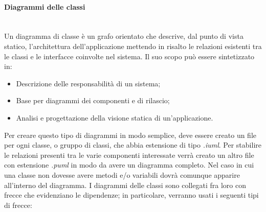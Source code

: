 \paragraph{Diagrammi delle classi}\mbox{}\\[0.4cm]
Un diagramma di classe è un grafo orientato che descrive, dal punto di vista statico, l'architettura dell'applicazione mettendo in risalto le relazioni esistenti tra le classi e le interfacce coinvolte nel sistema. Il suo scopo può essere sintetizzato in:
\begin{itemize}
    \item Descrizione delle responsabilità di un sistema;
    \item Base per diagrammi dei componenti e di rilascio;
    \item Analisi e progettazione della visione statica di un'applicazione.
\end{itemize}
Per creare questo tipo di diagrammi in modo semplice, deve essere creato un file per ogni classe, o gruppo di classi, che abbia estensione di tipo \textit{.iuml}. Per stabilire le relazioni presenti tra le varie componenti interessate verrà creato un altro file con estensione \textit{.puml} in modo da avere un diagramma completo. Nel caso in cui una classe non dovesse avere metodi e/o variabili dovrà comunque apparire all'interno del diagramma. I diagrammi delle classi sono collegati fra loro con frecce che evidenziano le dipendenze; in particolare, verranno usati i seguenti tipi di frecce:
